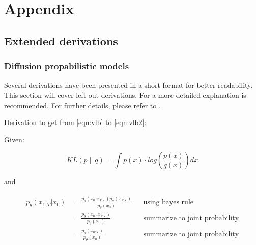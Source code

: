 \renewcommand\thesection{A.\arabic{section}}
\renewcommand\thefigure{A-\arabic{figure}}   
\renewcommand\thetable{A-\arabic{table}}   
\renewcommand\theequation{A.\arabic{equation}}   

\chapter{Appendix} 
\label{ch:Appendix}

\section{Extended derivations}
\label{A:derivations}
\subsection[]{Diffusion propabilistic models}
Several derivations have been presented in a short format for better readability.
This section will cover left-out derivations.
For a more detailed explanation \cite{weng2021WhatAreDiffusion, outlier2022DiffusionModelsPaper} is recommended.
For further details, please refer to \cite{sohl-dickstein2015DeepUnsupervisedLearning, ho2020DenoisingDiffusionProbabilistic}.

Derivation to get from \autoref{eqn:vlb} to \autoref{eqn:vlb2}:

Given:

\begin{equation}
    \label{eqn:kl-divergence_appendix}
    KL(p\parallel q) = \int p(x)\cdot log(\frac{p(x)}{q(x)})dx
\end{equation}

and

\begin{equation}
    \label{eqn:simplify1}
	\begin{align}
    p_\theta(x_{1:T}|x_0) &= \frac{p_\theta(x_0|x_{1:T})p_\theta(x_{1:T})}{p_\theta(x_0)} && \textrm{using bayes rule}\\
	&= \frac{p_\theta(x_0,x_{1:T})}{p_\theta(x_{0})} && \textrm{summarize to joint probability}\\
	&= \frac{p_\theta(x_{0:T})}{p_\theta(x_{0})} && \textrm{summarize to joint probability}\\
\end{align}
\end{equation}

